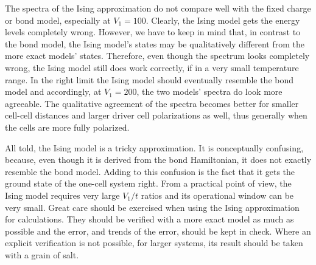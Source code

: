 The spectra of the Ising approximation do not compare well with the fixed charge
or bond model, especially at $V_1 = 100$. Clearly, the Ising model gets the
energy levels completely wrong. However, we have to keep in mind that, in
contrast to the bond model, the Ising model's states may be qualitatively
different from the more exact models' states. Therefore, even though the
spectrum looks completely wrong, the Ising model still does work correctly, if
in a very small temperature range. In the right limit the Ising model should
eventually resemble the bond model and accordingly, at $V_1 = 200$, the two
models' spectra do look more agreeable. The qualitative agreement of the spectra
becomes better for smaller cell-cell distances and larger driver cell
polarizations as well, thus generally when the cells are more fully polarized.

All told, the Ising model is a tricky approximation. It is conceptually
confusing, because, even though it is derived from the bond Hamiltonian, it does
not exactly resemble the bond model. Adding to this confusion is the fact that
it gets the ground state of the one-cell system right. From a practical point of
view, the Ising model requires very large $V_1/t$ ratios and its operational
window can be very small. Great care should be exercised when using the Ising
approximation for calculations. They should be verified with a more exact model
as much as possible and the error, and trends of the error, should be kept in
check. Where an explicit verification is not possible, for larger systems, its
result should be taken with a grain of salt.

